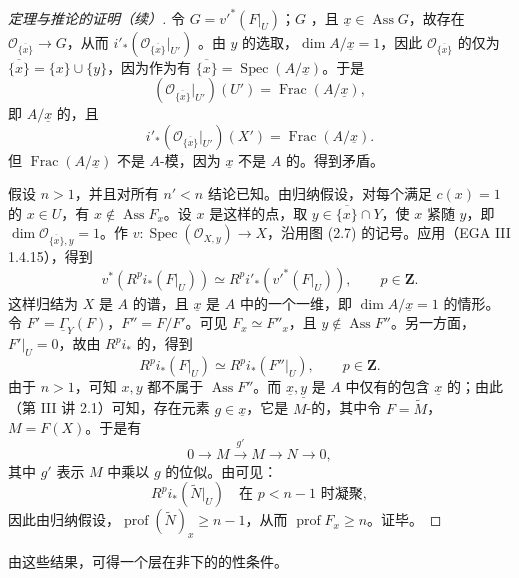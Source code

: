 \begin{proof}[定理与推论的证明（续）]
令 $G=v'^*(F|_U)$；$G$ ，且 $\underline x\in\operatorname{Ass}G$，故存在 $\mathscr O_{\overline{\{x\}}}\to G$，从而 $i'_*(\mathscr O_{\overline{\{x\}}}|_{U'})$ 。由 $y$ 的选取，$\dim A/\underline x=1$，因此 $\mathscr O_{\overline{\{x\}}}$ 的仅为 $\overline{\{x\}}=\{x\}\cup\{y\}$，因为作为有 $\overline{\{x\}}=\operatorname{Spec}(A/\underline x)$。于是
\[(\mathscr O_{\overline{\{x\}}}|_{U'})(U')=\operatorname{Frac}(A/\underline x),\]
即 $A/\underline x$ 的，且
\[i'_*(\mathscr O_{\overline{\{x\}}}|_{U'})(X')=\operatorname{Frac}(A/\underline x).\]
但 $\operatorname{Frac}(A/\underline x)$ 不是 $A$-模，因为 $\underline x$ 不是 $A$ 的。得到矛盾。

假设 $n>1$，并且对所有 $n'<n$ 结论已知。由归纳假设，对每个满足 $c(x)=1$ 的 $x\in U$，有 $x\notin\operatorname{Ass}F_x$。设 $x$ 是这样的点，取 $y\in\overline{\{x\}}\cap Y$，使 $x$ 紧随 $y$，即 $\dim\mathscr O_{\overline{\{x\}},y}=1$。作 $v:\operatorname{Spec}(\mathscr O_{X,y})\to X$，沿用图 (2.7) 的记号。应用（EGA III 1.4.15），得到
\[v^*(R^pi_*(F|_U))\simeq R^pi'_*(v'^*(F|_U)),\qquad p\in\mathbf Z.\]
这样归结为 $X$ 是 $A$ 的谱，且 $\underline x$ 是 $A$ 中的一个一维，即 $\dim A/\underline x=1$ 的情形。令 $F'=\underline\Gamma_Y(F)$，$F''=F/F'$。可见 $F_x\simeq F''_x$，且 $y\notin\operatorname{Ass}F''$。另一方面，$F'|_U=0$，故由 $R^pi_*$ 的，得到
\[R^pi_*(F|_U)\simeq R^pi_*(F''|_U),\qquad p\in\mathbf Z.\]
由于 $n>1$，可知 $x,y$ 都不属于 $\operatorname{Ass}F''$。而 $\underline x,\underline y$ 是 $A$ 中仅有的包含 $\underline x$ 的；由此（第 III 讲 2.1）可知，存在元素 $g\in\underline x$，它是 $M$-的，其中令 $F=\widetilde M$，$M=F(X)$。于是有
\[0\longrightarrow M\xrightarrow{g'}M\longrightarrow N\longrightarrow0,\]
其中 $g'$ 表示 $M$ 中乘以 $g$ 的位似。由可见：
\[R^pi_*(\widetilde N|_U)\quad\text{在 }p<n-1\text{ 时凝聚},\]
因此由归纳假设，$\operatorname{prof}(\widetilde N)_x\geq n-1$，从而 $\operatorname{prof}F_x\geq n$。证毕。
\end{proof}
由这些结果，可得一个层在非下的的性条件。
